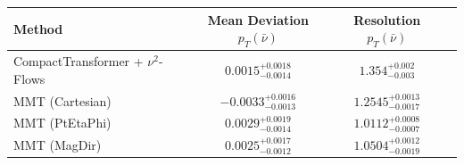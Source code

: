     \begin{tabular}{lccc}
        \toprule
        Method & Mean Deviation $p_{T}(\bar{\nu})$ & Resolution $p_{T}(\bar{\nu})$ \\
        \midrule
        CompactTransformer + $\nu^2$-Flows & $0.0015^{+0.0018}_{-0.0014}$ & $1.354^{+0.002}_{-0.003}$ \\
        MMT (Cartesian) & $-0.0033^{+0.0016}_{-0.0013}$ & $1.2545^{+0.0013}_{-0.0017}$ \\
        MMT (PtEtaPhi) & $0.0029^{+0.0019}_{-0.0014}$ & $1.0112^{+0.0008}_{-0.0007}$ \\
        MMT (MagDir) & $0.0025^{+0.0017}_{-0.0012}$ & $1.0504^{+0.0012}_{-0.0019}$ \\
        \bottomrule
    \end{tabular}